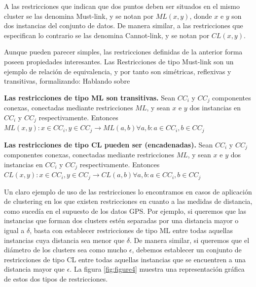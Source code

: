 A las restricciones que indican que dos puntos deben ser situados en el mismo cluster se las denomina Must-link, y se notan por $ML(x,y)$, donde $x$ e $y$ son dos instancias del conjunto de datos. De manera similar, a las restricciones que especifican lo contrario se las denomina Cannot-link, y se notan por $CL(x,y)$.

Aunque pueden parecer simples, las restricciones definidas de la anterior forma poseen propiedades interesantes. Las Restricciones de tipo Must-link son un ejemplo de relación de equivalencia, y por tanto son simétricas, reflexivas y transitivas, formalizando: Hablando sobre

\begin{observacion}
	\textbf{Las restricciones de tipo ML son transitivas.} Sean $CC_i$ y $CC_j$ componentes conexas, conectadas mediante restricciones $ML$, y sean $x$ e $y$ dos instancias en $CC_i$ y $CC_j$ respectivamente. Entonces $ML(x,y): x \in CC_i, y \in CC_j \rightarrow ML(a,b) \forall a,b: a\in CC_i, b \in CC_j$
\end{observacion}



\begin{observacion}
	\textbf{Las restricciones de tipo CL pueden ser (encadenadas).} Sean $CC_i$ y $CC_j$ componentes conexas, conectadas mediante restricciones $ML$, y sean $x$ e $y$ dos instancias en $CC_i$ y $CC_j$ respectivamente. Entonces $CL(x,y): x \in CC_i, y \in CC_j \rightarrow CL(a,b) \forall a,b: a\in CC_i, b \in CC_j$
\end{observacion}

Un claro ejemplo de uso de las restricciones lo encontramos en casos de aplicación de clustering en los que existen restricciones en cuanto a las medidas de distancia, como sucedía en el supuesto de los datos GPS. Por ejemplo, si queremos que las instancias que forman dos clusters estén separadas por una distancia mayor o igual a $\delta$, basta con establecer restricciones de tipo ML entre todas aquellas instancias cuya distancia sea menor que $\delta$. 
De manera similar, si queremos que el diámetro de los clusters sea como mucho $\epsilon$, debemos establecer un conjunto de restricciones de tipo CL entre todas aquellas instancias que se encuentren a una distancia mayor que $\epsilon$. La figura \ref{fig:figure4} muestra una representación gráfica de estos dos tipos de restricciones.

